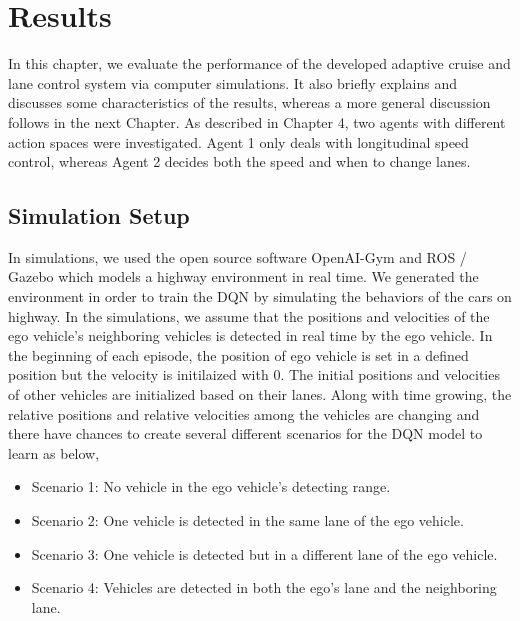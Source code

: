 \chapter{Results}

In this chapter, we evaluate the performance of the developed adaptive cruise and lane control system via computer simulations. It also briefly explains and discusses some characteristics of the results, whereas a more general discussion follows in the next Chapter. As described in Chapter 4, two agents with different action spaces were investigated. Agent 1 only deals with longitudinal speed control, whereas Agent 2 decides both the speed and when to change lanes.


\section{Simulation Setup}

In simulations, we used the open source software OpenAI-Gym and ROS / Gazebo which models a highway environment in real time. We generated the environment in order to train the DQN by simulating the behaviors of the cars on highway. In the simulations, we assume that the positions and velocities of the ego vehicle's neighboring vehicles is detected in real time by the ego vehicle. In the beginning of each episode, the position of ego vehicle is set in a defined position but the velocity is initilaized with 0. The initial positions and velocities of other vehicles are initialized based on their lanes. Along with time growing, the relative positions and relative velocities among the vehicles are changing and there have chances to create several different scenarios for the DQN model to learn as below,

\begin{itemize}
\item Scenario 1: No vehicle in the ego vehicle's detecting range.
\item Scenario 2: One vehicle is detected in the same lane of the ego vehicle.
\item Scenario 3: One vehicle is detected but in a different lane of the ego vehicle.
\item Scenario 4: Vehicles are detected in both the ego's lane and the neighboring lane.
\end{itemize}

